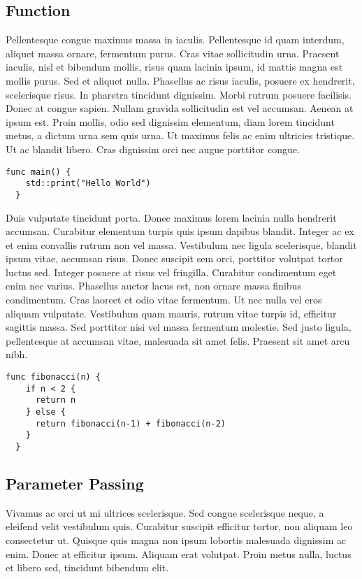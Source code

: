 \subsection{Function}
Pellentesque congue maximus massa in iaculis. Pellentesque id quam interdum, aliquet massa ornare, fermentum purus. Cras vitae sollicitudin urna. Praesent iaculis, nisl et bibendum mollis, risus quam lacinia ipsum, id mattis magna est mollis purus. Sed et aliquet nulla. Phasellus ac risus iaculis, posuere ex hendrerit, scelerisque risus. In pharetra tincidunt dignissim. Morbi rutrum posuere facilisis. Donec at congue sapien. Nullam gravida sollicitudin est vel accumsan. Aenean at ipsum est. Proin mollis, odio sed dignissim elementum, diam lorem tincidunt metus, a dictum urna sem quis urna. Ut maximus felis ac enim ultricies tristique. Ut ac blandit libero. Cras dignissim orci nec augue porttitor congue.
\begin{lstlisting}[language=Lucy]
  func main() {
    std::print("Hello World")
  }
\end{lstlisting}
Duis vulputate tincidunt porta. Donec maximus lorem lacinia nulla hendrerit accumsan. Curabitur elementum turpis quis ipsum dapibus blandit. Integer ac ex et enim convallis rutrum non vel massa. Vestibulum nec ligula scelerisque, blandit ipsum vitae, accumsan risus. Donec suscipit sem orci, porttitor volutpat tortor luctus sed. Integer posuere at risus vel fringilla. Curabitur condimentum eget enim nec varius. Phasellus auctor lacus est, non ornare massa finibus condimentum. Cras laoreet et odio vitae fermentum. Ut nec nulla vel eros aliquam vulputate. Vestibulum quam mauris, rutrum vitae turpis id, efficitur sagittis massa. Sed porttitor nisi vel massa fermentum molestie. Sed justo ligula, pellentesque at accumsan vitae, malesuada sit amet felis. Praesent sit amet arcu nibh.
\begin{lstlisting}[language=Lucy]
  func fibonacci(n) {
    if n < 2 {
      return n
    } else {
      return fibonacci(n-1) + fibonacci(n-2)
    }
  }
\end{lstlisting}

\subsection{Parameter Passing}
Vivamus ac orci ut mi ultrices scelerisque. Sed congue scelerisque neque, a eleifend velit vestibulum quis. Curabitur suscipit efficitur tortor, non aliquam leo consectetur ut. Quisque quis magna non ipsum lobortis malesuada dignissim ac enim. Donec at efficitur ipsum. Aliquam erat volutpat. Proin metus nulla, luctus et libero sed, tincidunt bibendum elit.


